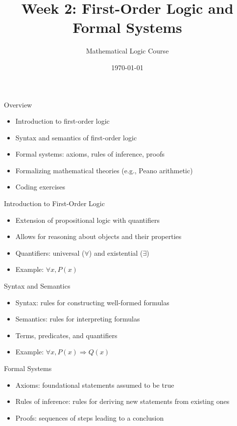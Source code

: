 \documentclass[presentation]{beamer}
\author{Mathematical Logic Course}
\date{\today}
\title{Week 2: First-Order Logic and Formal Systems}
\begin{document}
\maketitle

\begin{frame}[label={sec:org1654622}]{Overview}
\begin{itemize}
\item Introduction to first-order logic
\item Syntax and semantics of first-order logic
\item Formal systems: axioms, rules of inference, proofs
\item Formalizing mathematical theories (e.g., Peano arithmetic)
\item Coding exercises
\end{itemize}
\end{frame}

\begin{frame}[label={sec:org0ac0698}]{Introduction to First-Order Logic}
\begin{itemize}
\item Extension of propositional logic with quantifiers
\item Allows for reasoning about objects and their properties
\item Quantifiers: universal (\(\forall\)) and existential (\(\exists\))
\item Example: \(\forall x, P(x)\)
\end{itemize}
\end{frame}

\begin{frame}[label={sec:org0e20fcb}]{Syntax and Semantics}
\begin{itemize}
\item Syntax: rules for constructing well-formed formulas
\item Semantics: rules for interpreting formulas
\item Terms, predicates, and quantifiers
\item Example: \(\forall x, P(x) \Rightarrow Q(x)\)
\end{itemize}
\end{frame}

\begin{frame}[label={sec:org623705a}]{Formal Systems}
\begin{itemize}
\item Axioms: foundational statements assumed to be true
\item Rules of inference: rules for deriving new statements from existing ones
\item Proofs: sequences of steps leading to a conclusion
\end{itemize}
\end{frame}
\end{document}
